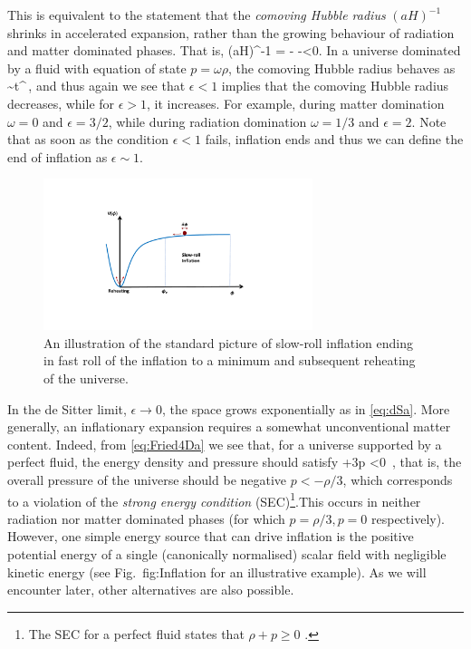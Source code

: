 This  is equivalent to the statement that  the {\em comoving Hubble radius} $(aH)^{-1}$ shrinks in accelerated expansion,
rather than the growing behaviour of radiation and matter dominated phases. That is,
\be
{}(aH)^{-1} = - -\epsilon \rb <0.
\ee
In a universe dominated by a fluid with equation of state $p=\omega \rho$, the comoving Hubble radius behaves as
\be
{} \sim t^{}\,,
\ee
and thus again we see that $\epsilon<1$ implies that the comoving Hubble radius decreases, while for $\epsilon>1$, it increases.
For example, during matter domination $\omega=0$ and $\epsilon = 3/2$, while during radiation domination $\omega=1/3$ and $\epsilon=2$.
Note that as soon as the condition $\epsilon<1$ fails, inflation ends and thus we can define the end of inflation as $\epsilon\sim 1$.

\begin{figure}[ht]
    \centering
    \includegraphics[width = 0.7\textwidth]{Sections/Figures/FigureInflation.pdf}
    \caption{An illustration of the standard picture of slow-roll inflation ending in fast roll of the inflation to a minimum and subsequent reheating of the universe.}
    \label{fig:Inflation}
\end{figure}

In the de Sitter limit, $\epsilon\to0$, the space grows exponentially as in \eqref{eq:dSa}. More generally, an inflationary expansion requires a somewhat unconventional matter content. Indeed, from \eqref{eq:Fried4Da} we see that, for a universe supported by a perfect fluid, the energy density and pressure should satisfy
\be
\rho+3p <0 \,,
\ee
that is, the overall pressure of the universe should be negative $p <-\rho/3$, which corresponds 
to a violation of the {\em strong energy condition} (SEC)\footnote{The SEC for a perfect fluid states that $\rho+p\geq 0$ \cite{Hawking:1973uf}.}.This occurs in neither radiation nor matter dominated phases (for which $p=\rho/3, p=0$ respectively).
However, one simple energy source that can drive inflation is the  positive potential energy  of a single (canonically normalised) scalar field with negligible kinetic energy (see Fig.~{fig:Inflation} for an illustrative example). As we will encounter later, other alternatives are also possible.

